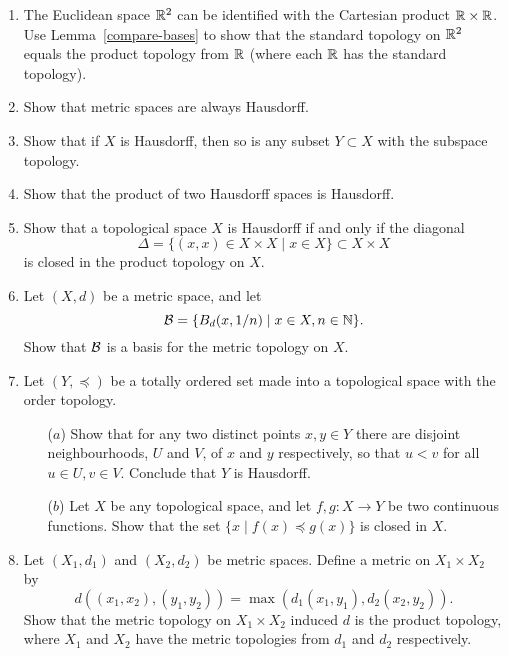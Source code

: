\begin{enumerate}
  \item The Euclidean space $\mathbb{R}^2$ can be identified with the Cartesian product $\mathbb{R} \times \mathbb{R}$. Use Lemma~\ref{compare-bases} to show that the standard topology on $\mathbb{R}^2$ equals the product topology from $\mathbb{R}$ (where each $\mathbb{R}$ has the standard topology).
  

  \item \label{metric-Hausdorff} Show that metric spaces are always Hausdorff.
  
  \item \label{subspace-Hausdorff} Show that if $X$ is Hausdorff, then so is any subset $Y\subset X$ with the subspace topology.
  
  \item \label{products-Hausdorff} Show that the product of two Hausdorff spaces is Hausdorff.
  
  \item Show that a topological space $X$ is Hausdorff if and only if the diagonal
  \[
    \Delta = \{(x,x) \in X \times X \mid x \in X \} \subset X \times X
  \]
  is closed in the product topology on $X$.
  
  \item \label{metric-first-countable} Let $(X,d)$ be a metric space, and let
  \[
    \mathcal{B} = \{ B_d(x,1/n) \mid x \in X, n \in \mathbb{N} \}.
  \]
  Show that $\mathcal{B}$ is a basis for the metric topology on $X$.
  
  \item Let $(Y,\preceq)$ be a totally ordered set made into a topological space with the order topology.
  \begin{itemize}
    \item[($a$)] Show that for any two distinct points $x, y \in Y$ there are disjoint neighbourhoods, $U$ and $V$, of $x$ and $y$ respectively, so that $u < v$ for all $u \in U, v \in V$. Conclude that $Y$ is Hausdorff.
    \item[($b$)] Let $X$ be any topological space, and let $f,g:X\to Y$ be two continuous functions. Show that the set $\{x \mid f(x)\preceq g(x)\}$ is closed in $X$.
  \end{itemize}
  
  \item Let $(X_1,d_1)$ and $(X_2,d_2)$ be metric spaces. Define a metric on $X_1 \times X_2$ by
	\[
	  d((x_1,x_2),(y_1,y_2)) = \max(d_1(x_1,y_1),d_2(x_2,y_2)).
  \]
  Show that the metric topology on $X_1 \times X_2$ induced $d$ is the product topology, where $X_1$ and $X_2$ have the metric topologies from $d_1$ and $d_2$ respectively.


\end{enumerate}
